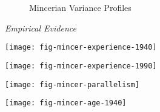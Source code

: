 \begin{frame}
\begin{figure}[htp]\centering
\caption{Mincerian Variance Profiles}\label{Mincerian Variance Profiles}
\end{figure}
\end{frame}
\begin{frame}\begin{center}
\LARGE\textit{Empirical Evidence}
\end{center}\end{frame}
\begin{frame}[plain]
\begin{center}
\texttt{[image: fig-mincer-experience-1940]}
\end{center}
\end{frame}
\begin{frame}[plain]
\begin{center}
\texttt{[image: fig-mincer-experience-1990]}
\end{center}
\end{frame}
\begin{frame}[plain]
\begin{center}
\texttt{[image: fig-mincer-parallelism]}
\end{center}
\end{frame}
\begin{frame}[plain]
\begin{center}
\texttt{[image: fig-mincer-age-1940]}
\end{center}
\end{frame}
